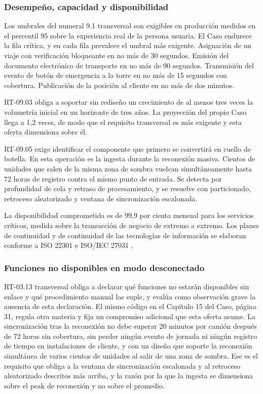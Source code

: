 \subsubsection{Desempeño, capacidad y disponibilidad}

Los umbrales del numeral 9.1 transversal son exigibles en producción medidos en el percentil 95
sobre la experiencia real de la persona usuaria. El Caso endurece la fila crítica, y en cada fila
prevalece el umbral más exigente. Asignación de un viaje con verificación bloqueante en no más de
30 segundos. Emisión del documento electrónico de transporte en no más de 90 segundos. Transmisión
del evento de botón de emergencia a la torre en no más de 15 segundos con cobertura. Publicación de
la posición al cliente en no más de dos minutos.

RT-09.03 obliga a soportar sin rediseño un crecimiento de al menos tres veces la volumetría inicial
en un horizonte de tres años. La proyección del propio Caso llega a 1,2 veces, de modo que el
requisito transversal es más exigente y esta oferta dimensiona sobre él.

RT-09.05 exige identificar el componente que primero se convertirá en cuello de botella. En esta
operación es la ingesta durante la reconexión masiva. Cientos de unidades que salen de la misma
zona de sombra vuelcan simultáneamente hasta 72 horas de registro contra el mismo punto de entrada.
Se detecta por profundidad de cola y retraso de procesamiento, y se resuelve con particionado,
retroceso aleatorizado y ventana de sincronización escalonada.

La disponibilidad comprometida es de 99,9 por ciento mensual para los servicios críticos, medida
sobre la transacción de negocio de extremo a extremo. Los planes de continuidad y de continuidad de
las tecnologías de información se elaboran conforme a ISO 22301 \parencite{iso22301} e ISO/IEC
27031 \parencite{iso27031}.

\subsubsection{Funciones no disponibles en modo desconectado}

RT-03.13 transversal obliga a declarar qué funciones no estarán disponibles sin enlace y qué
procedimiento manual las suple, y evalúa como observación grave la ausencia de esta declaración. El
mismo código en el Capítulo 15 del Caso, página 31, regula otra materia y fija un compromiso
adicional que esta oferta asume. La sincronización tras la reconexión no debe superar 20 minutos por
camión después de 72 horas sin cobertura, sin perder ningún evento de jornada ni ningún registro de
tiempo en instalaciones de cliente, y con un diseño que soporte la reconexión simultánea de varios
cientos de unidades al salir de una zona de sombra. Ese es el requisito que obliga a la ventana de
sincronización escalonada y al retroceso aleatorizado descritos más arriba, y la razón por la que la
ingesta se dimensiona sobre el peak de reconexión y no sobre el promedio.

